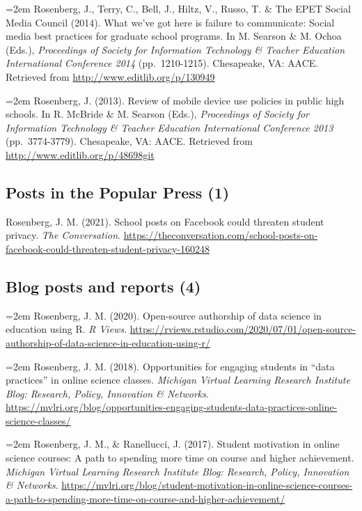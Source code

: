 \documentclass[
  14,
]{article}
\begin{document}
\hangindent=2em Rosenberg, J., Terry, C., Bell, J., Hiltz, V., Russo, T.
\& The EPET Social Media Council (2014). What we've got here is failure
to communicate: Social media best practices for graduate school
programs. In M. Searson \& M. Ochoa (Eds.), \emph{Proceedings of Society
for Information Technology \& Teacher Education International Conference
2014} (pp.~1210-1215). Chesapeake, VA: AACE. Retrieved from
\url{http://www.editlib.org/p/130949}

\hangindent=2em Rosenberg, J. (2013). Review of mobile device use
policies in public high schools. In R. McBride \& M. Searson (Eds.),
\emph{Proceedings of Society for Information Technology \& Teacher
Education International Conference 2013} (pp.~3774-3779). Chesapeake,
VA: AACE. Retrieved from \url{http://www.editlib.org/p/48698git}

\hypertarget{posts-in-the-popular-press-1}{%
\subsection{Posts in the Popular Press
(1)}\label{posts-in-the-popular-press-1}}

Rosenberg, J. M. (2021). School posts on Facebook could threaten student
privacy. \emph{The Conversation}.
\url{https://theconversation.com/school-posts-on-facebook-could-threaten-student-privacy-160248}

\hypertarget{blog-posts-and-reports-4}{%
\subsection{Blog posts and reports (4)}\label{blog-posts-and-reports-4}}

\hangindent=2em Rosenberg, J. M. (2020). Open-source authorship of data
science in education using R. \emph{R Views}.
\url{https://rviews.rstudio.com/2020/07/01/open-source-authorship-of-data-science-in-education-using-r/}

\hangindent=2em Rosenberg, J. M. (2018). Opportunities for engaging
students in ``data practices'' in online science classes. \emph{Michigan
Virtual Learning Research Institute Blog: Research, Policy, Innovation
\& Networks}.
\url{https://mvlri.org/blog/opportunities-engaging-students-data-practices-online-science-classes/}

\hangindent=2em Rosenberg, J. M., \& Ranellucci, J. (2017). Student
motivation in online science courses: A path to spending more time on
course and higher achievement. \emph{Michigan Virtual Learning Research
Institute Blog: Research, Policy, Innovation \& Networks}.
\url{https://mvlri.org/blog/student-motivation-in-online-science-courses-a-path-to-spending-more-time-on-course-and-higher-achievement/}
\end{document}
